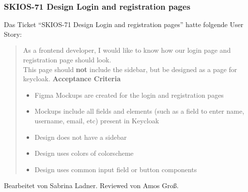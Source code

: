 \subsubsection{SKIOS-71 Design Login and registration pages}
Das Ticket \enquote{SKIOS-71 Design Login and registration pages} hatte folgende User Story:
\begin{quotation}
    As a frontend developer, I would like to know how our login page and registration page should look. \\
    This page should \textbf{not} include the sidebar, but be designed as a page for keycloak.
    \textbf{Acceptance Criteria}
    \begin{itemize}
        \item Figma Mockups are created for the login and registration pages
        \item Mockups include all fields and elements (such as a field to enter name, username, email, etc) present in Keycloak
        \item Design does not have a sidebar
        \item Design uses colors of colorscheme
        \item Design uses common input field or button components
    \end{itemize}
\end{quotation}
Bearbeitet von Sabrina Ladner.
Reviewed von Amos Groß.

